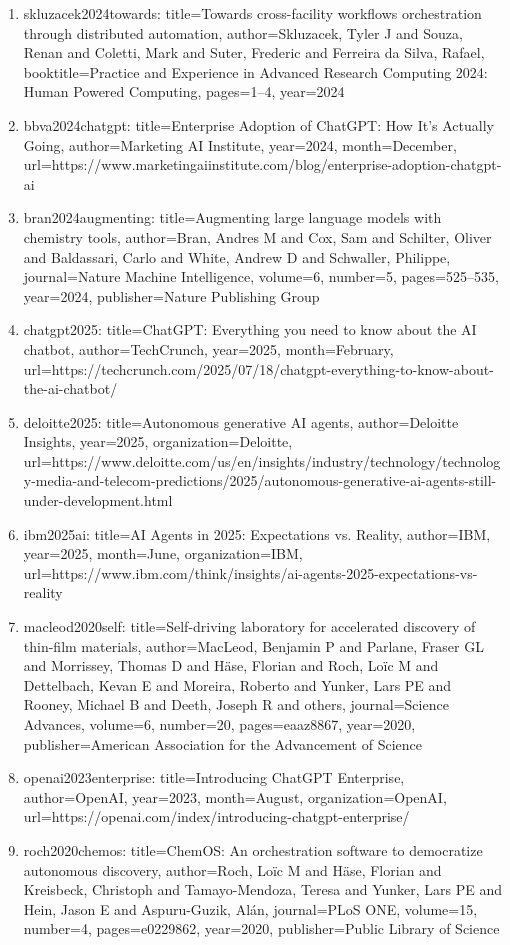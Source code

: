 \documentclass[11pt]{article}
\begin{document}
\begin{enumerate}[leftmargin=*]
  \item skluzacek2024towards: title=Towards cross-facility workflows orchestration through distributed automation, author=Skluzacek, Tyler J and Souza, Renan and Coletti, Mark and Suter, Frederic and Ferreira da Silva, Rafael, booktitle=Practice and Experience in Advanced Research Computing 2024: Human Powered Computing, pages=1--4, year=2024
  \item bbva2024chatgpt: title=Enterprise Adoption of ChatGPT: How It's Actually Going, author=Marketing AI Institute, year=2024, month=December, url=https://www.marketingaiinstitute.com/blog/enterprise-adoption-chatgpt-ai
  \item bran2024augmenting: title=Augmenting large language models with chemistry tools, author=Bran, Andres M and Cox, Sam and Schilter, Oliver and Baldassari, Carlo and White, Andrew D and Schwaller, Philippe, journal=Nature Machine Intelligence, volume=6, number=5, pages=525--535, year=2024, publisher=Nature Publishing Group
  \item chatgpt2025: title=ChatGPT: Everything you need to know about the AI chatbot, author=TechCrunch, year=2025, month=February, url=https://techcrunch.com/2025/07/18/chatgpt-everything-to-know-about-the-ai-chatbot/
  \item deloitte2025: title=Autonomous generative AI agents, author=Deloitte Insights, year=2025, organization=Deloitte, url=https://www.deloitte.com/us/en/insights/industry/technology/technology-media-and-telecom-predictions/2025/autonomous-generative-ai-agents-still-under-development.html
  \item ibm2025ai: title=AI Agents in 2025: Expectations vs. Reality, author=IBM, year=2025, month=June, organization=IBM, url=https://www.ibm.com/think/insights/ai-agents-2025-expectations-vs-reality
  \item macleod2020self: title=Self-driving laboratory for accelerated discovery of thin-film materials, author=MacLeod, Benjamin P and Parlane, Fraser GL and Morrissey, Thomas D and Häse, Florian and Roch, Loïc M and Dettelbach, Kevan E and Moreira, Roberto and Yunker, Lars PE and Rooney, Michael B and Deeth, Joseph R and others, journal=Science Advances, volume=6, number=20, pages=eaaz8867, year=2020, publisher=American Association for the Advancement of Science
  \item openai2023enterprise: title=Introducing ChatGPT Enterprise, author=OpenAI, year=2023, month=August, organization=OpenAI, url=https://openai.com/index/introducing-chatgpt-enterprise/
  \item roch2020chemos: title=ChemOS: An orchestration software to democratize autonomous discovery, author=Roch, Loïc M and Häse, Florian and Kreisbeck, Christoph and Tamayo-Mendoza, Teresa and Yunker, Lars PE and Hein, Jason E and Aspuru-Guzik, Alán, journal=PLoS ONE, volume=15, number=4, pages=e0229862, year=2020, publisher=Public Library of Science

\end{enumerate}
\end{document}
